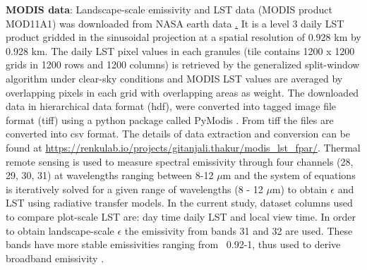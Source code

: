\documentclass[fleqn,10pt]{wlscirep}
\begin{document}
\textbf{MODIS data}:
Landscape-scale emissivity and LST data (MODIS product MOD11A1) was downloaded from NASA earth data \href{https://lpdaac.usgs.gov/}. It is a level 3 daily LST product gridded in the sinusoidal projection at a spatial resolution of 0.928 km by 0.928 km. The daily LST pixel values in each granules (tile contains 1200 x 1200 grids in 1200 rows and 1200 columns) is retrieved by the generalized split-window algorithm under clear-sky conditions and MODIS LST values are averaged by overlapping pixels in each grid with overlapping areas as weight\cite{wan2007collection}. The downloaded data in hierarchical data format (hdf), were converted into tagged image file format (tiff) using a python package called PyModis \cite{delucchi2014pymodis}. From tiff the files are converted into csv format. The details of data extraction and conversion can be found at \url{https://renkulab.io/projects/gitanjali.thakur/modis_lst_fpar/}.
Thermal remote sensing is used to measure spectral emissivity through four channels (28, 29, 30, 31) at wavelengths ranging between 8-12 $\mu$m \cite{jin2006improved} and the system of equations is iteratively solved for a given range of wavelengths (8 - 12 $\mu$m) to obtain $\epsilon$ and LST using radiative transfer models\cite{hulley2012quantifying,jin2006improved,wang2009evaluation}. In the current study,  dataset columns used to compare plot-scale LST are: day time daily LST and local view time. In order to obtain landscape-scale $\epsilon$ the emissivity from bands 31 and 32 are used. These bands have more stable emissivities ranging from ~0.92-1, thus used to derive broadband emissivity \cite{wan2007collection}. 
\end{document}
